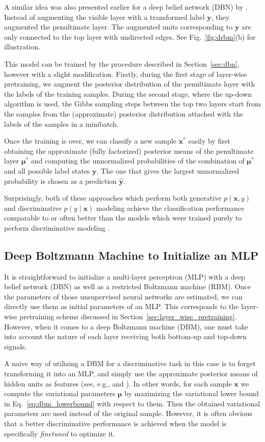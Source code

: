 \documentclass[dissertation,nocontribution,draft*]{aaltoseries}
\newcommand{\vect}[1]{\mathbf{#1}}
\newcommand{\vects}[1]{\boldsymbol{#1}}
\newcommand{\vx}[0]{\vect{x}}
\newcommand{\vy}[0]{\vect{y}}
\newcommand{\vmu}[0]{\vects{\mu}}
\begin{document}
A similar idea was also presented earlier for a deep belief
network (DBN) by \citet{Hinton2006nc}. Instead of augmenting
the visible layer with a transformed label $\vy$, they
augmented the penultimate layer. The augmented units
corresponding to $\vy$ are only connected to the top layer
with undirected edges. See Fig.~\ref{fig:drbm}(b) for
illustration.

This model can be trained by the procedure described in
Section~\ref{sec:dbn}, however with a slight modification.
Firstly, during the first stage of layer-wise pretraining,
we augment the posterior distribution of the penultimate
layer with the labels of the training samples. During the
second stage, where the up-down algorithm is used, the Gibbs
sampling steps between the top two layers start from the
samples from the (approximate) posterior distribution
attached with the labels of the samples in a minibatch. 

Once the training is over, we can classify a new sample $\vx^*$
easily by first obtaining the approximate (fully factorized)
posterior means of the penultimate layer $\vmu^*$ and
computing the unnormalized probabilities of the combination
of $\vmu^*$ and all possible label states $\vy$. The one
that gives the largest unnormalized probability is
chosen as a prediction $\hat{\vy}$.

Surprisingly, both of these approaches which perform both
generative $p(\vx, y)$ and discriminative $p(y \mid \vx)$
modeling achieve the classification performance comparable
to or often better than the models which were trained
purely to perform discriminative modeling
\citep{Hinton2006nc,Larochelle2008}.

\subsection{Deep Boltzmann Machine to Initialize an MLP}
\label{sec:mlp_dbm}

It is straightforward to initialize a multi-layer perceptron
(MLP) with a deep belief network (DBN) as well as a
restricted Boltzmann machine (RBM). Once the parameters of
those unsupervised neural networks are estimated, we can
directly use them as initial parameters of an MLP. This
corresponds to the layer-wise pretraining scheme discussed
in Section~\ref{sec:layer_wise_pretraining}.  However, when
it comes to a deep Boltzmann machine (DBM), one must take
into account the nature of each layer receiving both
bottom-up and top-down signals.

A naive way of utilizing a DBM for a discriminative task in
this case is to forget transforming it into an MLP,
and simply use the approximate posterior means of hidden
units as features (see, e.g., \citet{Montavon2012ai} and
). In other words, for
each sample $\vx$ we compute the variational parameters
$\vmu$ by maximizing the variational lower bound in
Eq.~\eqref{eq:dbm_lowerbound} with respect to them. Then
the obtained variational parameters are used instead of the
original sample.  However, it is often obvious that a
better discriminative performance is achieved when the model
is specifically \textit{finetuned} to optimize it.
\end{document}
